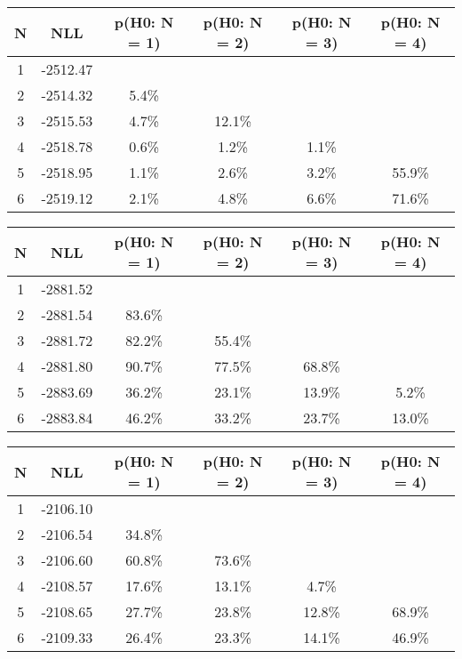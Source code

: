 \begin{table}[htb]
	\begin{center}
{\footnotesize\renewcommand{\arraystretch}{1.4}
		\begin{tabular}{cc||cccc}
			N & NLL & p(H0: N = 1) & p(H0: N = 2) & p(H0: N = 3) & p(H0: N = 4)\\ 
		\hline
1 & -2512.47 & & & & \\
2 & -2514.32 & 5.4\% & & & \\
3 & -2515.53 & 4.7\% & 12.1\% & & \\
4 & -2518.78 & 0.6\% & 1.2\% & 1.1\% & \\
5 & -2518.95 & 1.1\% & 2.6\% & 3.2\% & 55.9\% \\
6 & -2519.12 & 2.1\% & 4.8\% & 6.6\% & 71.6\% \\
	\end{tabular}
		\label{tab:lab}
	}
	\end{center}\end{table}

\begin{table}[htb]
	\begin{center}
{\footnotesize\renewcommand{\arraystretch}{1.4}
		\begin{tabular}{cc||cccc}
			N & NLL & p(H0: N = 1) & p(H0: N = 2) & p(H0: N = 3) & p(H0: N = 4)\\ 
		\hline
1 & -2881.52 & & & & \\
2 & -2881.54 & 83.6\% & & & \\
3 & -2881.72 & 82.2\% & 55.4\% & & \\
4 & -2881.80 & 90.7\% & 77.5\% & 68.8\% & \\
5 & -2883.69 & 36.2\% & 23.1\% & 13.9\% & 5.2\% \\
6 & -2883.84 & 46.2\% & 33.2\% & 23.7\% & 13.0\% \\
	\end{tabular}
		\label{tab:lab}
	}
	\end{center}\end{table}

\begin{table}[htb]
	\begin{center}
{\footnotesize\renewcommand{\arraystretch}{1.4}
		\begin{tabular}{cc||cccc}
			N & NLL & p(H0: N = 1) & p(H0: N = 2) & p(H0: N = 3) & p(H0: N = 4)\\ 
		\hline
1 & -2106.10 & & & & \\
2 & -2106.54 & 34.8\% & & & \\
3 & -2106.60 & 60.8\% & 73.6\% & & \\
4 & -2108.57 & 17.6\% & 13.1\% & 4.7\% & \\
5 & -2108.65 & 27.7\% & 23.8\% & 12.8\% & 68.9\% \\
6 & -2109.33 & 26.4\% & 23.3\% & 14.1\% & 46.9\% \\
	\end{tabular}
		\label{tab:lab}
	}
	\end{center}\end{table}

